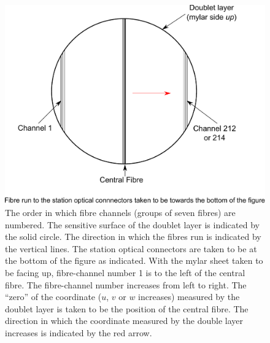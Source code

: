 \begin{figure}
  \begin{center}
    \includegraphics[width=0.85\linewidth]{detectors/tracker/02-Definitions/Figures/fibre-channel-numbering.pdf}
  \end{center}
  \caption{The order in which fibre channels (groups of seven fibres) are numbered. The sensitive surface of the doublet layer is indicated by the solid circle. The direction in which the fibres run is indicated by the vertical lines. The station optical connectors are taken to be at the bottom of the figure as indicated. With the mylar sheet taken to be facing up, fibre-channel number 1 is to the left of the central fibre. The fibre-channel number increases from left to right. The ``zero'' of the coordinate ($u$, $v$ or $w$ increases) measured by the doublet layer is taken to be the position of the central fibre. The direction in which the coordinate measured by the double layer increases is indicated by the red arrow.}
  \label{Fig:FbrChnlNmbrng}
\end{figure}

